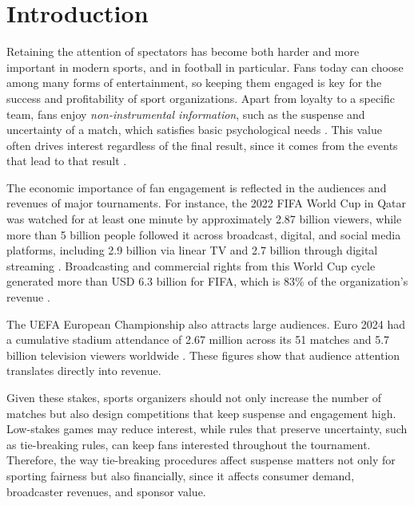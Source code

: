 \documentclass[11pt]{article}
\begin{document}
\newpage

\section{Introduction}

Retaining the attention of spectators has become both harder and more important in modern sports, and in football in particular. Fans today can choose among many forms of entertainment, so keeping them engaged is key for the success and profitability of sport organizations. Apart from loyalty to a specific team, fans enjoy \emph{non-instrumental information}, such as the suspense and uncertainty of a match, which satisfies basic psychological needs \citep{ely2015suspense, zillmann2013psychology}. This value often drives interest regardless of the final result, since it comes from the events that lead to that result \citep{vorderer2004enjoyment}.

The economic importance of fan engagement is reflected in the audiences and revenues of major tournaments. For instance, the 2022 FIFA World Cup in Qatar was watched for at least one minute by approximately 2.87 billion viewers, while more than 5 billion people followed it across broadcast, digital, and social media platforms, including 2.9 billion via linear TV and 2.7 billion through digital streaming \citep{fifa2022engagement, fifa2022audience}. Broadcasting and commercial rights from this World Cup cycle generated more than USD 6.3 billion for FIFA, which is 83\% of the organization's revenue \citep{fifa2022finance}.

The UEFA European Championship also attracts large audiences. Euro 2024 had a cumulative stadium attendance of 2.67 million across its 51 matches and 5.7 billion television viewers worldwide \citep{uefa2024numbers, uefa2024remember}. These figures show that audience attention translates directly into revenue.

Given these stakes, sports organizers should not only increase the number of matches but also design competitions that keep suspense and engagement high. Low-stakes games may reduce interest, while rules that preserve uncertainty, such as tie-breaking rules, can keep fans interested throughout the tournament. Therefore, the way tie-breaking procedures affect suspense matters not only for sporting fairness but also financially, since it affects consumer demand, broadcaster revenues, and sponsor value.
\end{document}
